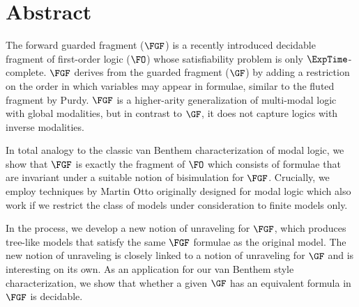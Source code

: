 \chapter*{Abstract}

\begingroup
\Large
\narrower
\narrower
The forward guarded fragment ($\FGF$) is a recently introduced decidable fragment of first-order logic ($\FO$) whose satisfiability problem is only $\ExpTime$-complete.
$\FGF$ derives from the guarded fragment ($\GF$) by adding a restriction on the order in which variables may appear in formulae, similar to the fluted fragment by Purdy.
$\FGF$ is a higher-arity generalization of multi-modal logic with global modalities, but in contrast to $\GF$, it does not capture logics with inverse modalities.

\baselineskip
\noindent
In total analogy to the classic van Benthem characterization of modal logic, we show that $\FGF$ is exactly the fragment of $\FO$ which consists of formulae that are invariant under a suitable notion of bisimulation for $\FGF$.
Crucially, we employ techniques by Martin Otto originally designed for modal logic which also work if we restrict the class of models under consideration to finite models only.

\baselineskip
\noindent
In the process, we develop a new notion of unraveling for $\FGF$, which produces tree-like models that satisfy the same $\FGF$ formulae as the original model.
The new notion of unraveling is closely linked to a notion of unraveling for $\GF$ and is interesting on its own.
As an application for our van Benthem style characterization, we show that whether a given $\GF$ has an equivalent formula in $\FGF$ is decidable.

\endgroup
